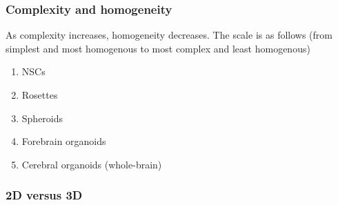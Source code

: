 \begin{itemize}
\subsubsection{Complexity and homogeneity}
As complexity increases, homogeneity decreases. The scale is as follows (from simplest and most homogenous to most complex and least homogenous)
\begin{enumerate}
    \item NSCs
    \item Rosettes
    \item Spheroids
    \item Forebrain organoids
    \item Cerebral organoids (whole-brain)
\end{enumerate}
\subsubsection{2D versus 3D}

\end{itemize}
